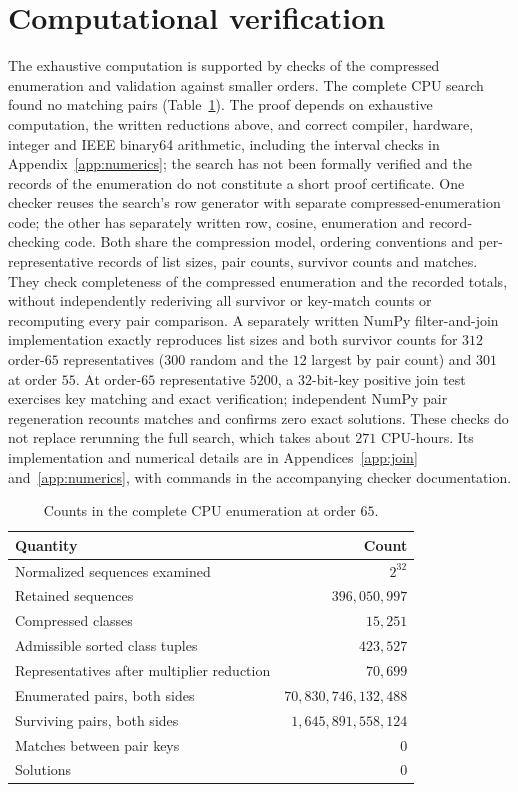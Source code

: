 \documentclass[11pt]{article}
\begin{document}
\section{Computational verification}\label{sec:computation}
The exhaustive computation is supported by checks of the compressed
enumeration and validation against smaller orders.
The complete CPU search found no matching pairs (Table~\ref{tab:counts}).
The proof depends on exhaustive computation, the written reductions above,
and correct compiler, hardware, integer and IEEE binary64 arithmetic,
including the interval checks in Appendix~\ref{app:numerics}; the search
has not been formally verified and the records of the enumeration do not
constitute a short proof certificate.
One checker reuses the search's row generator with separate compressed-enumeration
code; the other has separately written row, cosine, enumeration and
record-checking code. Both share the compression model, ordering conventions
and per-representative records of list sizes, pair counts, survivor counts
and matches. They check completeness of the compressed enumeration and the
recorded totals, without independently rederiving all survivor or key-match
counts or recomputing every pair comparison. A separately written NumPy
filter-and-join implementation exactly reproduces list sizes
and both survivor counts for $312$ order-$65$ representatives
($300$ random and the $12$ largest by pair count) and $301$ at order $55$.
At order-$65$ representative $5200$, a $32$-bit-key positive join test
exercises key matching and exact verification; independent NumPy
pair regeneration recounts matches and confirms zero
exact solutions. These checks do not replace rerunning the full search,
which takes about $271$ CPU-hours. Its implementation and
numerical details are in Appendices~\ref{app:join} and~\ref{app:numerics},
with commands in the accompanying checker documentation.

\begin{table}[!ht]
\centering
\begin{tabular}{lr}
\toprule
Quantity & Count\\
\midrule
Normalized sequences examined & $2^{32}$\\
Retained sequences & $396{,}050{,}997$\\
Compressed classes & $15{,}251$\\
Admissible sorted class tuples & $423{,}527$\\
Representatives after multiplier reduction & $70{,}699$\\
Enumerated pairs, both sides & $70{,}830{,}746{,}132{,}488$\\
Surviving pairs, both sides & $1{,}645{,}891{,}558{,}124$\\
Matches between pair keys & $0$\\
Solutions & $0$\\
\bottomrule
\end{tabular}
\caption{Counts in the complete CPU enumeration at order $65$.}
\label{tab:counts}
\end{table}
\end{document}
